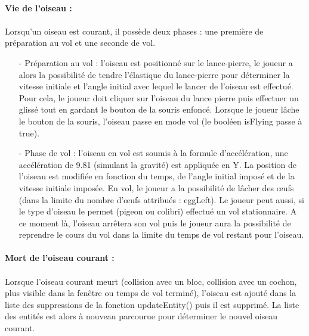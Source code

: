 \documentclass[a4paper,12pt]{report}
\begin{document}
\paragraph{Vie de l'oiseau :}

\paragraph{}Lorsqu'un oiseau est courant, il possède deux phases : une première de préparation au vol et une seconde de vol.\\

\begin{itemize}
\item[-]Préparation au vol : l'oiseau est positionné sur le lance-pierre, le joueur a alors la possibilité de tendre l’élastique du lance-pierre pour  déterminer la vitesse initiale et l'angle initial avec lequel le lancer de l'oiseau est effectué. Pour cela, le joueur doit cliquer sur l'oiseau du lance pierre puis effectuer un glissé tout en gardant le bouton de la souris enfoncé. Lorsque le joueur lâche le bouton de la souris, l'oiseau passe en mode vol (le booléen isFlying passe à true).
\item[-]Phase de vol : l'oiseau en vol est soumis à la formule d’accélération, une accélération de 9.81 (simulant la gravité) est appliquée en Y. La position de l'oiseau est modifiée en fonction du temps, de l'angle initial imposé et de la vitesse initiale imposée. En vol, le joueur a la possibilité de lâcher des œufs (dans la limite du nombre d’œufs attribués : eggLeft). Le joueur peut aussi, si le type d'oiseau le permet (pigeon ou colibri) effectué un vol stationnaire. A ce moment là, l'oiseau arrêtera son vol puis le joueur aura la possibilité de reprendre le cours du vol  dans la limite du temps de vol restant pour l'oiseau.
\end{itemize}

\paragraph{Mort de l'oiseau courant :}

\paragraph{}Lorsque l'oiseau courant meurt (collision avec un bloc, collision avec un cochon, plus visible dans la fenêtre ou temps de vol terminé), l'oiseau est ajouté dans la liste des suppressions de la fonction updateEntity() puis il est supprimé. La liste des entités est alors à nouveau parcourue pour déterminer le nouvel oiseau courant.
\end{document}
